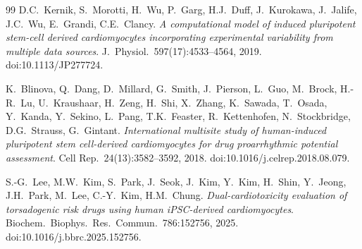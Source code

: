 \documentclass[preprint,12pt]{elsarticle}
\begin{document}
\begin{thebibliography}{99}
D.C.~Kernik, S.~Morotti, H.~Wu, P.~Garg, H.J.~Duff, J.~Kurokawa, J.~Jalife,
J.C.~Wu, E.~Grandi, C.E.~Clancy.
\emph{A computational model of induced pluripotent stem-cell derived cardiomyocytes
incorporating experimental variability from multiple data sources}.
J.\ Physiol.\ 597(17):4533--4564, 2019. doi:10.1113/JP277724.

K.~Blinova, Q.~Dang, D.~Millard, G.~Smith, J.~Pierson, L.~Guo, M.~Brock, H.-R.~Lu,
U.~Kraushaar, H.~Zeng, H.~Shi, X.~Zhang, K.~Sawada, T.~Osada, Y.~Kanda, Y.~Sekino,
L.~Pang, T.K.~Feaster, R.~Kettenhofen, N.~Stockbridge, D.G.~Strauss, G.~Gintant.
\emph{International multisite study of human-induced pluripotent stem cell-derived
cardiomyocytes for drug proarrhythmic potential assessment}.
Cell Rep.\ 24(13):3582--3592, 2018. doi:10.1016/j.celrep.2018.08.079.

S.-G.~Lee, M.W.~Kim, S.~Park, J.~Seok, J.~Kim, Y.~Kim, H.~Shin, Y.~Jeong,
J.H.~Park, M.~Lee, C.-Y.~Kim, H.M.~Chung.
\emph{Dual-cardiotoxicity evaluation of torsadogenic risk drugs using human
iPSC-derived cardiomyocytes}.
Biochem.\ Biophys.\ Res.\ Commun.\ 786:152756, 2025.
doi:10.1016/j.bbrc.2025.152756.
\end{thebibliography}
\end{document}
